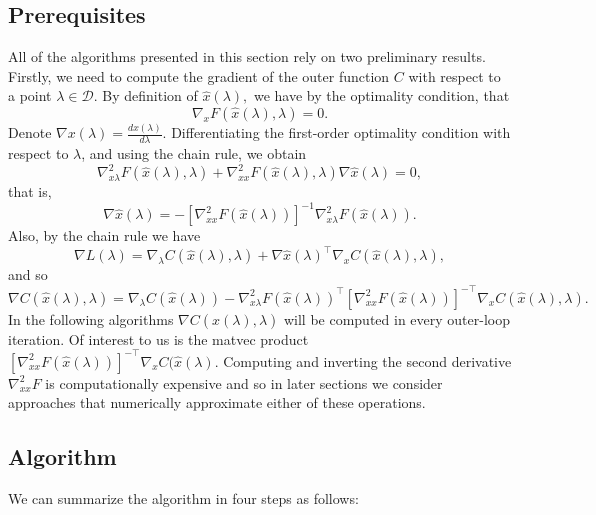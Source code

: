 \documentclass[11pt, twoside]{report}
\begin{document}
\subsection{Prerequisites}
All of the algorithms presented in this section rely on two preliminary results. Firstly, we need to compute the gradient of the outer function $C$ with respect to a point $\lambda \in \mathcal{D}$. By definition of $\hat{x}(\lambda),$ we have by the optimality condition, that
\begin{equation} \label{opt_cond_smooth}
    \nabla_x F(\hat{x}(\lambda),\lambda) = 0.
\end{equation}
Denote $\nabla x(\lambda) = \frac{dx(\lambda)}{d\lambda}$. Differentiating the first-order optimality condition with respect to $\lambda$, and using the chain rule, we obtain
\begin{equation} \label{ift_opt}
    \nabla^2_{x\lambda} F(\hat{x}(\lambda),\lambda) + \nabla^2_{xx} F(\hat{x}(\lambda),\lambda) \nabla \hat{x}(\lambda) = 0,
\end{equation}
that is, 
\[\nabla \hat{x}(\lambda) = -\left[ \nabla^2_{xx} F(\hat{x}(\lambda)) \right]^{-1}\nabla^2_{x \lambda} F(\hat{x}(\lambda)).\]
Also, by the chain rule we have
\[\nabla L(\lambda) = \nabla_\lambda C(\hat{x}(\lambda), \lambda) + \nabla \hat{x}(\lambda)^\top \nabla_x C(\hat{x}(\lambda), \lambda),\]
and so
\[\nabla C(\hat{x}(\lambda), \lambda) = \nabla_\lambda C(\hat{x}(\lambda)) - \nabla^2_{x \lambda} F(\hat{x}(\lambda))^\top \left[ \nabla^2_{xx} F(\hat{x}(\lambda)) \right]^{-\top} \nabla_x C(\hat{x}(\lambda), \lambda).\]
In the following algorithms $\nabla C(\hat{x}(\lambda), \lambda)$ will be computed in every outer-loop iteration. Of interest to us is the matvec product $\left[ \nabla^2_{xx} F(\hat{x}(\lambda)) \right]^{-\top} \nabla_x C(\hat{x}(\lambda)$. Computing and inverting the second derivative $\nabla^2_{xx} F$ is computationally expensive and so in later sections we consider approaches that numerically approximate either of these operations.
\subsection{Algorithm}
We can summarize the algorithm in four steps as follows:
\end{document}
